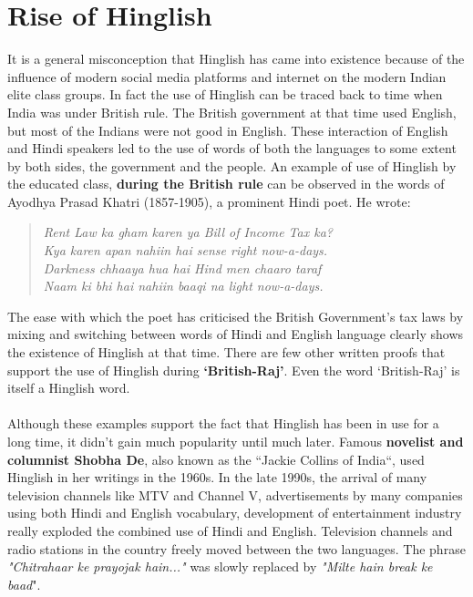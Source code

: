 \documentclass{article}
\begin{document}
\section{Rise of Hinglish}
It is a general misconception that Hinglish has came into existence because of the influence of modern social media platforms and internet on the modern Indian elite class groups. In fact the use of Hinglish can be traced back to time when India was under British rule. The British government at that time used English, but most of the Indians were not good in English. These interaction of English and Hindi speakers led to the use of words of both the languages to some extent by both sides, the government and the people. An example of use of Hinglish by the educated class, \textbf{during the British rule} can be observed in the words of Ayodhya Prasad Khatri (1857-1905), a prominent Hindi poet. He wrote:
\begin{quote}
    \centering
    \textit{Rent Law ka gham karen ya Bill of Income Tax ka?\\
        Kya karen apan nahiin hai sense right now-a-days.\\
        Darkness chhaaya hua hai Hind men chaaro taraf\\
        Naam ki bhi hai nahiin baaqi na light now-a-days.}
\end{quote}
The ease with which the poet has criticised the British Government's tax laws by mixing and switching between words of Hindi and English language clearly shows the existence of Hinglish at that time. There are few other written proofs that support the use of Hinglish during \textbf{`British-Raj'}. Even the word `British-Raj' is itself a Hinglish word. \\\\
Although these examples support the fact that Hinglish has been in use for a long time, it didn't gain much popularity until much later. Famous \textbf{novelist and columnist Shobha De}, also known as the ``Jackie Collins of India``, used Hinglish in her writings in the 1960s. In the late 1990s, the arrival of many television channels like MTV and Channel V, advertisements by many companies using both Hindi and English vocabulary, development of entertainment industry really exploded the combined use of Hindi and English. Television channels and radio stations in the country freely moved between the two languages. The phrase \textit{"Chitrahaar ke prayojak hain..."} was slowly replaced by \textit{"Milte hain break ke baad}". \\\\
\end{document}
